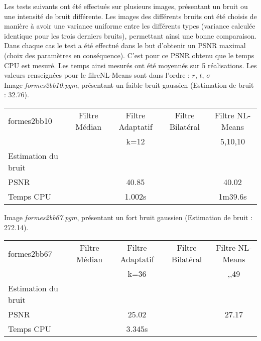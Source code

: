 \documentclass[a4,12pt]{article}
\begin{document}
Les tests suivants ont été effectués sur plusieurs images, présentant un bruit ou une intensité de bruit différente. Les images des différents bruits ont été choisis de manière à avoir une variance uniforme entre les différents types (variance calculée identique pour les trois derniers bruits), permettant ainsi une bonne comparaison.\\

Dans chaque cas le test a été effectué dans le but d'obtenir un PSNR maximal (choix des paramètres en conséquence). C'est pour ce PSNR obtenu que le temps CPU est mesuré. Les temps ainsi mesurés ont été moyennés sur 5 réalisations. Les valeurs renseignées pour le filreNL-Means sont dans l'ordre : $r$, $t$, $\sigma$\\

Image \textit{formes2bb10.pgm}, présentant un faible bruit gaussien (Estimation de bruit : 32.76).

\begin{center}
\begin{tabular}{|l||c|c|c|c|}
\hline
formes2bb10 & Filtre Médian & Filtre Adaptatif & Filtre Bilatéral & Filtre NL-Means \\
& & k=12 & & 5,10,10\\
\hline
Estimation du bruit
&
&
&
&\\
\hline
PSNR
&
& 40.85
&
& 40.02\\
\hline
Temps CPU
& 
& 1.002s
&
& 1m39.6s\\
\hline
\end{tabular} 
\end{center}

\vspace{2em}

Image \textit{formes2bb67.pgm}, présentant un fort bruit gaussien (Estimation de bruit : 272.14).

\begin{center}
\begin{tabular}{|l||c|c|c|c|}
\hline
formes2bb67 & Filtre Médian & Filtre Adaptatif & Filtre Bilatéral & Filtre NL-Means\\
& & k=36 & & ,,49\\
\hline
Estimation du bruit
&
&
&
&\\
\hline
PSNR
&
& 25.02
&
& 27.17\\
\hline
Temps CPU
&
& 3.345s
&
& \\
\hline
\end{tabular} 
\end{center}
\end{document}
